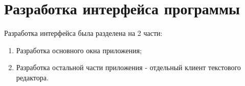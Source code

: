 \section{Разработка интерфейса программы}

Разработка интерфейса была разделена на 2 части:

\begin{enumerate}
  \item Разработка основного окна приложения;
  \item Разработка остальной части приложения - отдельный клиент текстового редактора.
\end{enumerate}

